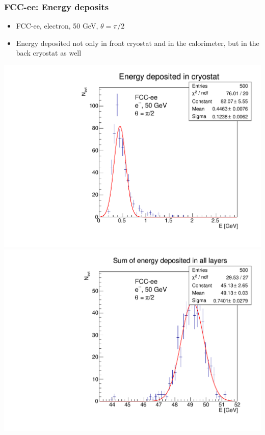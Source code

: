 \documentclass{beamer}
\newcommand{\redtext}[1]{%
  \textcolor{myRed}{#1}
}
\begin{document}
\begin{frame}
  \frametitle{FCC-ee: Energy deposits}

  \begin{itemize}
    \item FCC-ee, electron, 50 GeV, $\theta = \pi/2$
    \item Energy deposited not only in front cryostat and in the
          calorimeter, \redtext{but in the back cryostat as well}
  \end{itemize}

  \includegraphics[width=0.49\linewidth]{figures/energy_fccee/energyInCryo.pdf}
  \includegraphics[width=0.49\linewidth]{figures/energy_fccee/sumEinLayers.pdf}
\end{frame}
\end{document}
